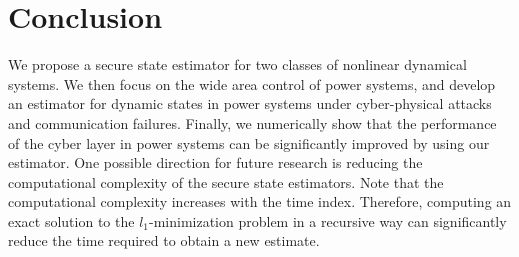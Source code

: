 \documentclass[../../thesis.tex]{subfiles}
\begin{document}
%








\section{Conclusion}
We propose a secure state estimator for two classes of nonlinear dynamical systems. We then focus on the wide area control of power systems, and develop an estimator for dynamic states in power systems under cyber-physical attacks and communication failures. Finally, we numerically show that the performance of the cyber layer in power systems can be significantly improved by using our estimator. One possible direction for future research is reducing the computational complexity of the secure state estimators. Note that the computational complexity increases with the time index. Therefore, computing an exact solution to the $l_1$-minimization problem in a recursive way can significantly reduce the time required to obtain a new estimate.
\end{document}
